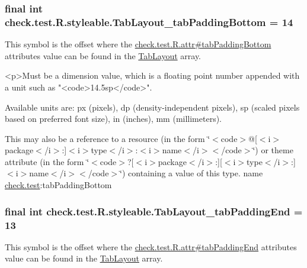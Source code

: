 \subsubsection[{Tab\+Layout\+\_\+tab\+Padding\+Bottom}]{\setlength{\rightskip}{0pt plus 5cm}final int check.\+test.\+R.\+styleable.\+Tab\+Layout\+\_\+tab\+Padding\+Bottom = 14\hspace{0.3cm}{\ttfamily [static]}}\label{classcheck_1_1test_1_1_r_1_1styleable_aca2df98e251a1a4ec4ae92a5fbd6d93d}
This symbol is the offset where the \hyperlink{classcheck_1_1test_1_1_r_1_1attr_aa4e3f622e42c4b3fd08ed0f5308d4b2c}{check.\+test.\+R.\+attr\#tab\+Padding\+Bottom} attribute\textquotesingle{}s value can be found in the \hyperlink{classcheck_1_1test_1_1_r_1_1styleable_a2a3232e8d38a43f5131a16385abbbed8}{Tab\+Layout} array.

\begin{DoxyVerb}      <p>Must be a dimension value, which is a floating point number appended with a unit such as "<code>14.5sp</code>".
\end{DoxyVerb}
 Available units are\+: px (pixels), dp (density-\/independent pixels), sp (scaled pixels based on preferred font size), in (inches), mm (millimeters). 

This may also be a reference to a resource (in the form \char`\"{}$<$code$>$@\mbox{[}$<$i$>$package$<$/i$>$\+:\mbox{]}$<$i$>$type$<$/i$>$\+:$<$i$>$name$<$/i$>$$<$/code$>$\char`\"{}) or theme attribute (in the form \char`\"{}$<$code$>$?\mbox{[}$<$i$>$package$<$/i$>$\+:\mbox{]}\mbox{[}$<$i$>$type$<$/i$>$\+:\mbox{]}$<$i$>$name$<$/i$>$$<$/code$>$\char`\"{}) containing a value of this type.  name \hyperlink{namespacecheck_1_1test}{check.\+test}\+:tab\+Padding\+Bottom \hypertarget{classcheck_1_1test_1_1_r_1_1styleable_ac49de9adbf423ca62f717d2cad3f8e55}{}
\subsubsection[{Tab\+Layout\+\_\+tab\+Padding\+End}]{\setlength{\rightskip}{0pt plus 5cm}final int check.\+test.\+R.\+styleable.\+Tab\+Layout\+\_\+tab\+Padding\+End = 13\hspace{0.3cm}{\ttfamily [static]}}\label{classcheck_1_1test_1_1_r_1_1styleable_ac49de9adbf423ca62f717d2cad3f8e55}
This symbol is the offset where the \hyperlink{classcheck_1_1test_1_1_r_1_1attr_a5d95af079992521323154cf2aa35dfaa}{check.\+test.\+R.\+attr\#tab\+Padding\+End} attribute\textquotesingle{}s value can be found in the \hyperlink{classcheck_1_1test_1_1_r_1_1styleable_a2a3232e8d38a43f5131a16385abbbed8}{Tab\+Layout} array.

